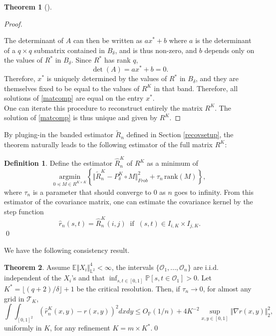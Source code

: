 \documentclass[10pt, a4paper]{report}
\newcommand{\E}[0]{\mathbb{E}}
\newcommand{\Ll}[0]{\mathbb{L}}
\newcommand{\Pp}[0]{\mathbb{P}}
\theoremstyle{definition}
\newtheorem{theorem}{Theorem}
\newtheorem{definition}{Definition}
\theoremstyle{remark}
\begin{document}
\begin{theorem}[\cite{DP2}]
\begin{proof}
\begin{figure}[ht]
		\label{fig:matcomp}
		\end{figure}
		The determinant of $A$ can then be written as $ax^* + b$ where $a$ is the determinant of a $q\times q$ submatrix contained in $B_\delta$, and is thus non-zero, and $b$ depends only on the values of $R^*$ in $B_\delta$. Since $R^*$ has rank $q$, $$\det(A)=ax^*+b=0.$$ 
		Therefore, $x^*$ is uniquely determined by the values of $R^*$ in $B_\delta$, and they are themselves fixed to be equal to the values of $R^K$ in that band. Therefore, all solutions of \ref{matcomp} are equal on the entry $x^*$.\\
		One can iterate this procedure to reconstruct entirely the matrix $R^K$. The solution of \ref{matcomp} is thus unique and given by $R^K$. 
	\end{proof}
	By pluging-in the banded estimator $\tilde{R}_n$ defined in Section \ref{recovsetup}, the theorem naturally leads to the following estimator of the full matrix $R^K$:
	\begin{definition}
		Define the estimator $\hat{R}_n^K$ of $R^K$ as a minimum of 
		\begin{equation}
			\underset{0 \preceq M \in R^{K\times K}}{\text{argmin}} \left\{\Vert \tilde{R}_n^K - P_\delta^K \circ  M \Vert_{Frob}^2 + \tau_n \, \text{rank}(M) \right\},
		\end{equation}
		where $\tau_n$ is a parameter that should converge to 0 as $n$ goes to infinity. From this estimator of the covariance matrix, one can estimate the covariance kernel by the step function
		\begin{equation}
			\hat{r}_n(s,t) = \hat{R}_n^K(i,j) \ \text{ if } \ (s,t)\in I_{i,K}\times I_{j,K}.
		\end{equation}
		\qed
	\end{definition}
\end{theorem}
We have the following consistency result.
\begin{theorem}
	Assume $\E\Vert X_i \Vert^4_{\Ll^2} < \infty$, the intervals $\{\mathcal{O}_1,...,\mathcal{O}_n\}$ are i.i.d. independent of the $X_i$'s and that $\inf_{s,t \in [0,1]} \Pp\left[s,t \in \mathcal{O}_1\right]>0$. Let $K^*= \lfloor (q+2)/\delta\rfloor + 1$ be the critical resolution. Then, if $\tau_n \to 0$, for almost any grid in $\mathcal{T}_K$, 
	\begin{equation}
		\int\int_{[0,1]^2}  \left(\hat{r}_n^K(x,y)-r(x,y)\right)^2 dxdy \leq O_{\Pp}(1/n) + 4K^{-2} \sup_{x,y \in [0,1]} \Vert \nabla r(x,y)\Vert_2^2,
	\end{equation}
	uniformly in $K$, for any refinement $K=m\times K^*$.\qed
\end{theorem}
\end{document}
